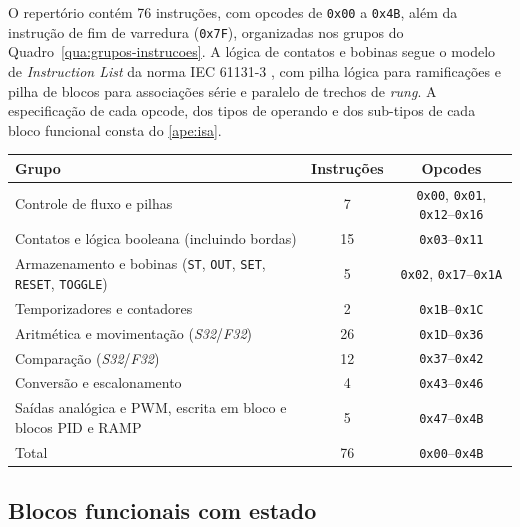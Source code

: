 O repertório contém 76 instruções, com opcodes de \texttt{0x00} a \texttt{0x4B}, além da instrução de fim de varredura (\texttt{0x7F}), organizadas nos grupos do Quadro~\ref{qua:grupos-instrucoes}.
A lógica de contatos e bobinas segue o modelo de \textit{Instruction List} da norma IEC 61131-3 \cite{iec:2025}, com pilha lógica para ramificações e pilha de blocos para associações série e paralelo de trechos de \textit{rung}.
A especificação de cada opcode, dos tipos de operando e dos sub-tipos de cada bloco funcional consta do \ref{ape:isa}.

\begin{quadrofixo}
    \centering
    \begin{tabular}{|p{6.1cm}|c|c|}
        \hline
        Grupo & Instruções & Opcodes \\
        \hline
        Controle de fluxo e pilhas & 7 & \texttt{0x00}, \texttt{0x01}, \texttt{0x12}--\texttt{0x16} \\
        \hline
        Contatos e lógica booleana (incluindo bordas) & 15 & \texttt{0x03}--\texttt{0x11} \\
        \hline
        Armazenamento e bobinas (\texttt{ST}, \texttt{OUT}, \texttt{SET}, \texttt{RESET}, \texttt{TOGGLE}) & 5 & \texttt{0x02}, \texttt{0x17}--\texttt{0x1A} \\
        \hline
        Temporizadores e contadores & 2 & \texttt{0x1B}--\texttt{0x1C} \\
        \hline
        Aritmética e movimentação (\textit{S32}/\textit{F32}) & 26 & \texttt{0x1D}--\texttt{0x36} \\
        \hline
        Comparação (\textit{S32}/\textit{F32}) & 12 & \texttt{0x37}--\texttt{0x42} \\
        \hline
        Conversão e escalonamento & 4 & \texttt{0x43}--\texttt{0x46} \\
        \hline
        Saídas analógica e PWM, escrita em bloco e blocos PID e RAMP & 5 & \texttt{0x47}--\texttt{0x4B} \\
        \hline
        Total & 76 & \texttt{0x00}--\texttt{0x4B} \\
        \hline
    \end{tabular}

    \label{qua:grupos-instrucoes}
\end{quadrofixo}

\subsection{Blocos funcionais com estado}
\label{sub:blocos-funcionais}

